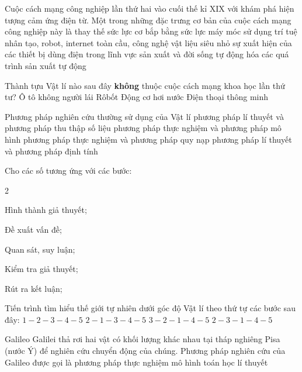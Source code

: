 
\begin{ex}%
Cuộc cách mạng công nghiệp lần thứ hai vào cuối thế kỉ XIX với khám phá hiện tượng cảm ứng điện từ. Một trong những đặc trưng cơ bản của cuộc cách mạng công nghiệp này là
\choice
{thay thế sức lực cơ bắp bằng sức lực máy móc}
{sử dụng trí tuệ nhân tạo, robot, internet toàn cầu, công nghệ vật liệu siêu nhỏ}
{\True sự xuất hiện của các thiết bị dùng điện trong lĩnh vực sản xuất và đời sống}
{tự động hóa các quá trình sản xuất tự động}
\end{ex}

\begin{ex}%
Thành tựu Vật lí nào sau đây \textbf{không} thuộc cuộc cách mạng khoa học lần thứ tư?
\choice
{Ô tô không người lái}
{Rôbốt}
{\True Động cơ hơi nước}
{Điện thoại thông minh}
\end{ex}

\begin{ex}%
Phương pháp nghiên cứu thường sử dụng của Vật lí
\choice
{phương pháp lí thuyết và phương pháp thu thập số liệu}
{\True phương pháp thực nghiệm và phương pháp mô hình}
{phương pháp thực nghiệm và phương pháp quy nạp}
{phương pháp lí thuyết và phương pháp định tính}	
\end{ex}
\begin{ex}%
Cho các số tương ứng với các bước:
\begin{enumEX}[1.]{2}
\item Hình thành giả thuyết;		
\item Đề xuất vấn đề;		
\item Quan sát, suy luận;		
\item Kiểm tra giả thuyết;		
\item Rút ra kết luận;		
\end{enumEX}

Tiến trình tìm hiểu thế giới tự nhiên dưới góc độ Vật lí theo thứ tự các bước sau đây:
\choice
{$1-2-3-4-5$}
{$2-1-3-4-5$}
{\True $3-2-1-4-5$}
{$2-3-1-4-5$}

\end{ex}

\begin{ex}%
Galileo Galilei thả rơi hai vật có khối lượng khác nhau tại tháp nghiêng Pisa (nước Ý) để nghiên cứu chuyển động của chúng. Phương pháp nghiên cứu của Galileo được gọi là phương pháp
\choice
{\True thực nghiệm}
{mô hình}
{toán học}
{lí thuyết}
\end{ex}

